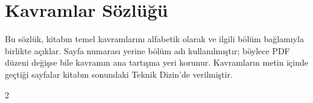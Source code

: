 \chapter*{Kavramlar Sözlüğü}

Bu sözlük, kitabın temel kavramlarını alfabetik olarak ve ilgili bölüm
bağlamıyla birlikte açıklar. Sayfa numarası yerine bölüm adı kullanılmıştır;
böylece PDF düzeni değişse bile kavramın ana tartışma yeri korunur. Kavramların
metin içinde geçtiği sayfalar kitabın sonundaki Teknik Dizin'de verilmiştir.

\begin{multicols}{2}
\raggedcolumns
\raggedright
\footnotesize
\setlength{\parindent}{0pt}
\setlength{\parskip}{0.22em}


\end{multicols}
